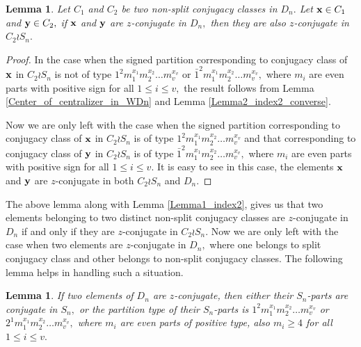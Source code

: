 \documentclass[12pt,twoside,reqno]{amsart}
\newtheorem{lemma}[theorem]{Lemma}
\theoremstyle{definition}
\numberwithin{equation}{section}
\begin{document}
\begin{lemma}\label{non-split-in-D_n}
Let $C_1$ and $C_2$ be two non-split conjugacy classes in $D_n.$ Let ${\bf x}\in C_1$ and ${\bf y}\in C_2, $ if ${\bf x}$ and ${\bf y}$ are $z$-conjugate in $D_n,$ then they are also $z$-conjugate in $C_2\wr S_n.$ 
\end{lemma}
\begin{proof}
In the case when the signed  partition corresponding to conjugacy class of ${\bf x}$ in $C_2 \wr S_n$ is not of type $1^2m_1^{x_1}m_2^{x_2}\dots m_v^{x_v}$ or $\bar{1}^2m_1^{x_1}m_2^{x_2}\dots m_v^{x_v},$ where $m_i$ are even parts with positive sign for all $1\leq i\leq v,$ the result follows from Lemma \ref{Center_of_centralizer_in_WDn} and  Lemma \ref{Lemma2_index2_converse}.

Now we are only left with the case when the signed  partition corresponding to conjugacy class of ${\bf x}$ in $C_2 \wr S_n$ is of type $1^2m_1^{x_1}m_2^{x_2}\dots m_v^{x_v}$ and that corresponding to conjugacy class of ${\bf y}$ in $C_2 \wr S_n$ is of type $\bar{1}^2m_1^{x_1}m_2^{x_2}\dots m_v^{x_v},$ where $m_i$ are even parts with positive sign for all $1\leq i\leq v.$ It is easy to see in this case, the elements ${\bf x}$ and ${\bf y}$ are $z$-conjugate in both $C_2 \wr S_n$  and  $D_n.$ 
\end{proof}

The above lemma along with Lemma \ref{Lemma1_index2}, gives us that two elements belonging to two distinct non-split conjugacy classes are $z$-conjugate in $D_n$ if and only if they are $z$-conjugate in $C_2 \wr S_n.$ Now we are only left with the case when two elements are $z$-conjugate in $D_n,$ where one belongs to split conjugacy class and other belongs to non-split conjugacy classes. The following lemma helps in handling such a situation.

\begin{lemma}\label{S_n_parts_D_n}
If two elements of $D_n$ are $z$-conjugate, then either their $S_n$-parts are conjugate in $S_n,$ or the partition type of their $S_n$-parts is $1^2m_1^{x_1}m_2^{x_2}\dots m_v^{x_v}$ or $2^1m_1^{x_1}m_2^{x_2}\dots m_v^{x_v},$ where $m_i$ are even parts of positive type, also $m_i\geq 4$ for all $1\leq i\leq v.$ 
\end{lemma}
\end{document}
